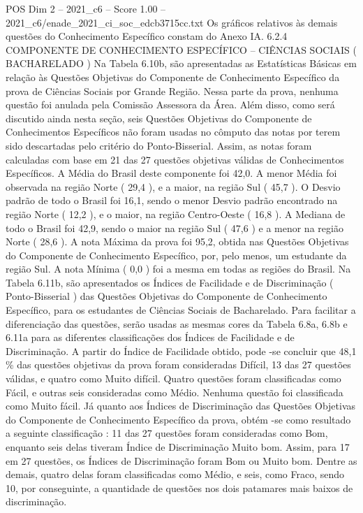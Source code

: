 \begin{textsample}{POS Dim 2 – 2021\_c6 – Score 1.00 – 2021\_c6/enade\_2021\_ci\_soc\_edcb3715cc.txt}
Os gráficos relativos às demais questões do Conhecimento Específico constam do Anexo IA. 6.2.4 COMPONENTE DE CONHECIMENTO ESPECÍFICO – CIÊNCIAS SOCIAIS ( BACHARELADO ) Na Tabela 6.10b, são apresentadas as Estatísticas Básicas em relação às Questões Objetivas do Componente de Conhecimento Específico da prova de Ciências Sociais por Grande Região.
Nessa parte da prova, nenhuma questão foi anulada pela Comissão Assessora da Área.
Além disso, como será discutido ainda nesta seção, seis Questões Objetivas do Componente de Conhecimentos Específicos não foram usadas no cômputo das notas por terem sido descartadas pelo critério do Ponto-Bisserial.
Assim, as notas foram calculadas com base em 21 das 27 questões objetivas válidas de Conhecimentos Específicos.
A Média do Brasil deste componente foi 42,0.
A menor Média foi observada na região Norte ( 29,4 ), e a maior, na região Sul ( 45,7 ).
O Desvio padrão de todo o Brasil foi 16,1, sendo o menor Desvio padrão encontrado na região Norte ( 12,2 ), e o maior, na região Centro-Oeste ( 16,8 ).
A Mediana de todo o Brasil foi 42,9, sendo o maior na região Sul ( 47,6 ) e a menor na região Norte ( 28,6 ).
A nota Máxima da prova foi 95,2, obtida nas Questões Objetivas do Componente de Conhecimento Específico, por, pelo menos, um estudante da região Sul.
A nota Mínima ( 0,0 ) foi a mesma em todas as regiões do Brasil.
Na Tabela 6.11b, são apresentados os Índices de Facilidade e de Discriminação ( Ponto-Bisserial ) das Questões Objetivas do Componente de Conhecimento Específico, para os estudantes de Ciências Sociais de Bacharelado.
Para facilitar a diferenciação das questões, serão usadas as mesmas cores da Tabela 6.8a, 6.8b e 6.11a para as diferentes classificações dos Índices de Facilidade e de Discriminação.
A partir do Índice de Facilidade obtido, pode -se concluir que 48,1 \% das questões objetivas da prova foram consideradas Difícil, 13 das 27 questões válidas, e quatro como Muito difícil.
Quatro questões foram classificadas como Fácil, e outras seis consideradas como Médio.
Nenhuma questão foi classificada como Muito fácil.
Já quanto aos Índices de Discriminação das Questões Objetivas do Componente de Conhecimento Específico da prova, obtém -se como resultado a seguinte classificação : 11 das 27 questões foram consideradas como Bom, enquanto seis delas tiveram Índice de Discriminação Muito bom.
Assim, para 17 em 27 questões, os Índices de Discriminação foram Bom ou Muito bom.
Dentre as demais, quatro delas foram classificadas como Médio, e seis, como Fraco, sendo 10, por conseguinte, a quantidade de questões nos dois patamares mais baixos de discriminação.

\end{textsample}
